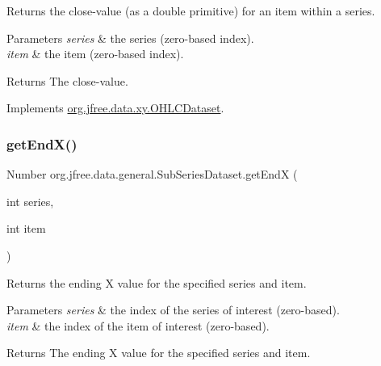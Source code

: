 Returns the close-\/value (as a double primitive) for an item within a series.


\begin{DoxyParams}{Parameters}
{\em series} & the series (zero-\/based index). \\
\hline
{\em item} & the item (zero-\/based index).\\
\hline
\end{DoxyParams}
\begin{DoxyReturn}{Returns}
The close-\/value. 
\end{DoxyReturn}


Implements \mbox{\hyperlink{interfaceorg_1_1jfree_1_1data_1_1xy_1_1_o_h_l_c_dataset_a5533f5d89de4aec9d67cfdc9289a1099}{org.\+jfree.\+data.\+xy.\+O\+H\+L\+C\+Dataset}}.

\mbox{\label{classorg_1_1jfree_1_1data_1_1general_1_1_sub_series_dataset_a31357199c9b8e9bf07d4559ca9003d84}} 
\subsubsection{\texorpdfstring{get\+End\+X()}{getEndX()}}
{\footnotesize\ttfamily Number org.\+jfree.\+data.\+general.\+Sub\+Series\+Dataset.\+get\+EndX (\begin{DoxyParamCaption}\item[{int}]{series,  }\item[{int}]{item }\end{DoxyParamCaption})}

Returns the ending X value for the specified series and item.


\begin{DoxyParams}{Parameters}
{\em series} & the index of the series of interest (zero-\/based). \\
\hline
{\em item} & the index of the item of interest (zero-\/based).\\
\hline
\end{DoxyParams}
\begin{DoxyReturn}{Returns}
The ending X value for the specified series and item. 
\end{DoxyReturn}


